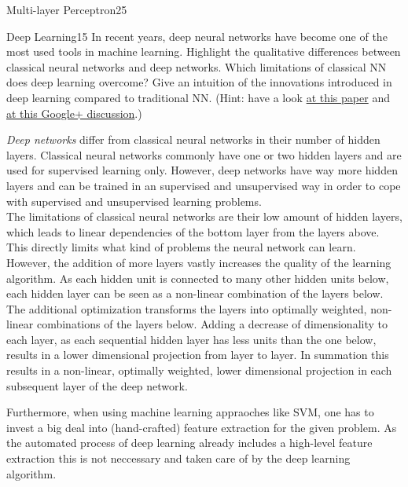 \begin{questions}
\begin{question}{Multi-layer Perceptron}{25}
\end{question}


\begin{question}[bonus]{Deep Learning}{15}
In recent years, deep neural networks have become one of the most used tools in machine learning. 
Highlight the qualitative differences between classical neural networks and deep networks. Which limitations of classical NN does deep learning overcome?
Give an intuition of the innovations introduced in deep learning compared to traditional NN.
(Hint: have a look \href{http://arxiv.org/abs/1206.5538}{at this paper} and \href{https://plus.google.com/100849856540000067209/posts/9BDtGwCDL7D}{at this Google+ discussion}.)

\begin{answer}
\emph{Deep networks} differ from classical neural networks in their number of hidden layers. Classical neural networks commonly have one or two hidden layers and are used for supervised learning only. However, deep networks have way more hidden layers and can be trained in an supervised and unsupervised way in order to cope with supervised and unsupervised learning problems.\\

The limitations of classical neural networks are their low amount of hidden layers, which leads to  linear dependencies of the bottom layer from the layers above. This directly limits what kind of problems the neural network can learn. However, the addition of more layers vastly increases the quality of the learning algorithm. As each hidden unit is connected to many other hidden units below, each hidden layer can be seen as a non-linear combination of the layers below. The additional optimization transforms the layers into optimally weighted, non-linear combinations of the layers below. Adding a decrease of dimensionality to each layer, as each sequential hidden layer has less units than the one below, results in a lower dimensional projection from layer to layer. In summation this results in a non-linear, optimally weighted, lower dimensional projection in each subsequent layer of the deep network.

Furthermore, when using machine learning appraoches like SVM, one has to invest a big deal into (hand-crafted) feature extraction for the given problem. As the automated process of deep learning already includes a high-level feature extraction this is not neccessary and taken care of by the deep learning algorithm.
\end{answer}

\end{question}


\end{questions}
